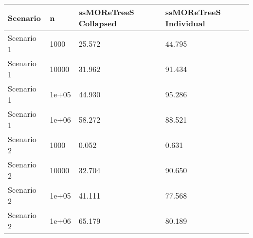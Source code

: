 \begin{tabular}{llll}
  \hline
Scenario & n & ssMOReTreeS Collapsed & ssMOReTreeS Individual \\ 
  \hline
Scenario 1 & 1000 & 25.572 & 44.795 \\ 
  Scenario 1 & 10000 & 31.962 & 91.434 \\ 
  Scenario 1 & 1e+05 & 44.930 & 95.286 \\ 
  Scenario 1 & 1e+06 & 58.272 & 88.521 \\ 
  Scenario 2 & 1000 & 0.052 & 0.631 \\ 
  Scenario 2 & 10000 & 32.704 & 90.650 \\ 
  Scenario 2 & 1e+05 & 41.111 & 77.568 \\ 
  Scenario 2 & 1e+06 & 65.179 & 80.189 \\ 
   \hline
\end{tabular}

